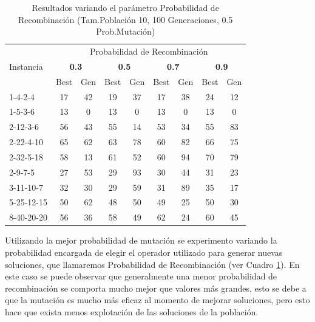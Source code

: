 \documentclass[letter, 10pt]{article}
\begin{document}
\begin{table}[]
\centering
\begin{tabular}{l|cccccccc}
    \hline
                &\multicolumn{8}{c}{Probabilidad de Recombinación}\\
   Instancia    &\multicolumn{2}{c}{\textbf{0.3}}&\multicolumn{2}{c}{\textbf{0.5}}&\multicolumn{2}{c}{\textbf{0.7}}&\multicolumn{2}{c}{\textbf{0.9}}\\
                &Best   & Gen   &Best   & Gen   & Best  & Gen   &   Best    & Gen\\

    \hline
    1-4-2-4     &  17   &   42  &   19  &   37  &   17  &   38  &   24  &   12  \\
    1-5-3-6     &  13   &   0   &   13  &   0   &   13  &   0   &   13  &   0   \\
    2-12-3-6    &  56   &   43  &   55  &   14  &   53  &   34  &   55  &   83  \\
    2-22-4-10   &  65   &   62  &   63  &   78  &   60  &   82  &   66  &   75  \\ 
    2-32-5-18   &  58   &   13  &   61  &   52  &   60  &   94  &   70  &   79  \\
    2-9-7-5     &  27   &   53  &   29  &   93  &   30  &   44  &   31  &   23  \\
    3-11-10-7   &  32   &   30  &   29  &   59  &   31  &   89  &   35  &   17  \\
    5-25-12-15  &  50   &   62  &   48  &   50  &   49  &   25  &   50  &   30  \\
    8-40-20-20  &  56   &   36  &   58  &   49  &   62  &   24  &   60  &   45
\end{tabular}
\caption{Resultados variando el parámetro Probabilidad de Recombinación (Tam.Población 10, 100 Generaciones, 0.5 Prob.Mutación)}
\label{tab:crossprob}
\end{table}

Utilizando la mejor probabilidad de mutación se experimento variando la probabilidad encargada de elegir el operador utilizado para generar nuevas soluciones, que llamaremos Probabilidad de Recombinación (ver Cuadro \ref{tab:crossprob}). En este caso se puede observar que generalmente una menor probabilidad de recombinación se comporta mucho mejor que valores más grandes, esto se debe a que la mutación es mucho más eficaz al momento de mejorar soluciones, pero esto hace que exista menos explotación de las soluciones de la población.
\end{document}
